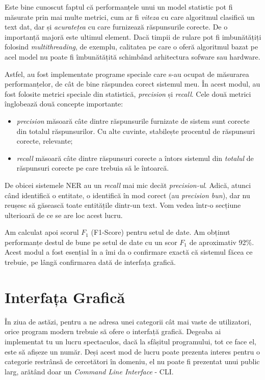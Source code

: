 Este bine cunoscut faptul că performanțele unui un model statistic pot fi măsurate prin mai multe metrici, cum ar fi \textit{viteza} cu care algoritmul clasifică un text dat, dar și \textit{acuratețea} cu care furnizează răspunsurile corecte. De o importanță majoră este ultimul element. Dacă timpii de rulare pot fi imbunătățiți folosind \textit{multithreading}, de exemplu, calitatea pe care o oferă algoritmul bazat pe acel model nu poate fi îmbunătățită schimbând arhitectura sofware sau hardware.

Astfel, au fost implementate programe speciale care s-au ocupat de măsurarea performanțelor, de cât de bine răspundea corect sistemul meu. În acest modul, au fost folosite metrici speciale din statistică, \textit{precision} și \textit{recall}. Cele două metrici înglobează două concepte importante:

\begin{itemize}
\item \textit{precision} măsoară câte dintre răspunsurile furnizate de sistem sunt corecte din totalul răspunsurilor. Cu alte cuvinte, stabilește procentul de răspunsuri corecte, relevante;

\item \textit{recall} măsoară câte dintre răspunsuri corecte a întors sistemul din \textit{totalul} de răspunsuri corecte pe care trebuia să le întoarcă.
\end{itemize}

De obicei sistemele NER au un \textit{recall} mai mic decăt \textit{precision-ul}. Adică, atunci când identifică o entitate, o identifică în mod corect (au \textit{precision bun}), dar nu reușesc să găsească toate entitățile dintr-un text. Vom vedea într-o secțiune ulterioară de ce se are loc acest lucru.

Am calculat apoi scorul $F_1$ (F1-Score) pentru setul de date. Am obținut performanțe destul de bune pe setul de date cu un scor $F_1$ de aproximativ 92\%. Acest modul a fost esențial în a îmi da o confirmare exactă că sistemul făcea ce trebuie, pe lângă confirmarea dată de interfața grafică.

\section{Interfața Grafică}

În ziua de astăzi, pentru a ne adresa unei categorii cât mai vaste de utilizatori, orice program modern trebuie să ofere o interfață grafică. Degeaba ai implementat tu un lucru spectaculos, dacă la sfâșitul programului, tot ce face el, este să afișeze un număr. Deși acest mod de lucru poate prezenta interes pentru o categorie restrânsă de cercetători în domeniu, el nu poate fi prezentat unui public larg, arătând doar un \textit{Command Line Interface} - CLI.

